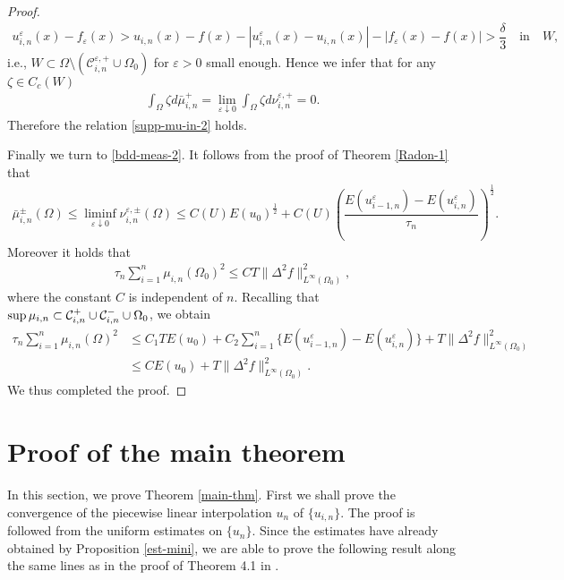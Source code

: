 \documentclass[12pt]{amsart}
\begin{document}
\begin{proof}
\begin{align*}
u^{\varepsilon}_{i,n}(x) - f_{\varepsilon}(x) 
 > u_{i,n}(x) - f(x) - {\left| {u^{\varepsilon}_{i,n}(x) - u_{i,n}(x)} \right|} - {\left| {f_{\varepsilon}(x) - f(x)} \right|} 
 > \dfrac{\delta}{3} \quad \text{in} \quad W, 
\end{align*}
i.e., $W \subset \Omega \setminus ({\mathcal{C}}^{{\varepsilon},+}_{i,n} \cup \Omega_0)$ for ${\varepsilon}>0$ small enough. 
Hence we infer that  for any ${\zeta} \in C_c(W)$ 
\begin{align*}
\int_\Omega {\zeta} d \bar{\mu}^{+}_{i,n} 
 = \lim_{{\varepsilon} \downarrow 0} \int_\Omega {\zeta} d \nu^{{\varepsilon},+}_{i,n} =0. 
\end{align*}
Therefore the relation \eqref{supp-mu-in-2} holds. 

Finally we turn to \eqref{bdd-meas-2}. 
It follows from the proof of Theorem \ref{Radon-1} that 
\begin{align*}
\bar{\mu}^{\pm}_{i,n}(\Omega) \le \liminf_{{\varepsilon} \downarrow 0} \nu^{{\varepsilon},\pm}_{i,n}(\Omega) 
\le C(U) E(u_0)^{\frac{1}{2}} + C(U) \left( \dfrac{ E(u^{\varepsilon}_{i-1,n}) - E(u^{\varepsilon}_{i,n}) }{\tau_n} \right)^{\frac{1}{2}}.  
\end{align*}
Moreover it holds that  
\begin{align*}
\tau_{n} \sum^{n}_{i=1} \mu_{i,n}(\Omega_{0})^{2} \le C T \| \Delta^2 f \|^2_{L^{\infty}(\Omega_0)},  
\end{align*}
where the constant $C$ is independent of $n$. 
Recalling that ${\rm sup}\, \mu_{i,n} \subset {\mathcal{C}}^{+}_{i,n} \cup {\mathcal{C}}^{-}_{i,n} \cup \Omega_0$, we obtain 
\begin{align*}
\tau_n \sum^{n}_{i=1} \mu_{i,n}(\Omega)^2 
 &\le C_1 T E(u_0) + C_2 \sum^{n}_{i=1} \{ E(u^{\varepsilon}_{i-1,n}) - E(u^{\varepsilon}_{i,n}) \} + T \| \Delta^2 f \|^2_{L^{\infty}(\Omega_0)} \\
 &\le C E(u_0) + T \| \Delta^2 f \|^2_{L^{\infty}(\Omega_0)}. 
\end{align*}
We thus completed the proof. 
\end{proof}

\section{Proof of the main theorem} \label{proof-of-main-theorem}
In this section, we prove Theorem \ref{main-thm}. 
First we shall prove the convergence of the piecewise linear interpolation $u_{n}$ of $\{ u_{i,n} \}$. 
The proof is followed from the uniform estimates on $\{u_{n} \}$. 
Since the estimates have already obtained by Proposition \ref{est-mini}, we are able to prove the following result along the 
same lines as in the proof of Theorem 4.1 in \cite{NO}. 
\end{document}
